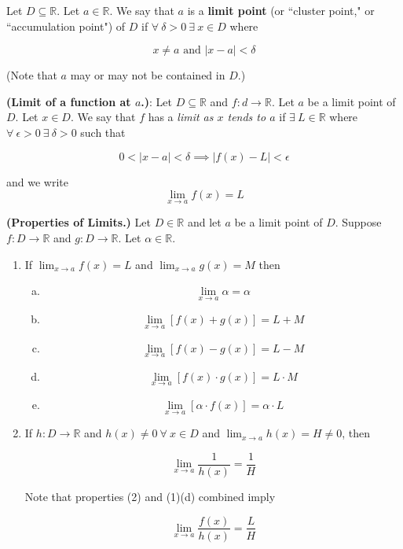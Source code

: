 \begin{definition}\label{ra.def.limit.point} Let \(D \subseteq \mathbb{R}\). Let \(a \in \mathbb{R}\). We say that \(a\) is a \textbf{limit point} (or ``cluster point," or ``accumulation point") of \(D\) if \(\forall \ \delta > 0 \ \exists \ x \in D\) where

\[
x \neq a \text{ and } |x - a| < \delta
\]

(Note that \(a\) may or may not be contained in \(D\).)

\end{definition}

\begin{definition} \textbf{(Limit of a function at \(a\).)}: Let \(D \subseteq \mathbb{R}\) and \(f:d \to \mathbb{R}\). Let \(a\) be a limit point of \(D\). Let \(x \in D\). We say that \(f\) has a \textit{limit as \(x\) tends to \(a\)} if \(\exists \ L \in \mathbb{R}\) where \(\forall \ \epsilon > 0 \ \exists \ \delta > 0 \) such that

\[
0 < |x - a| < \delta \implies |f(x) - L| < \epsilon
\]

and we write \[\lim_{x \to a} f(x) = L\]

\end{definition}

\begin{proposition} \textbf{(Properties of Limits.)} Let \(D \in \mathbb{R}\) and let \(a\) be a limit point of \(D\). Suppose \(f:D \to \mathbb{R}\) and \(g: D \to \mathbb{R}\). Let \(\alpha \in \mathbb{R}\).

\begin{enumerate}[(1)]

\item If \(\lim_{x \to a} f(x) = L\) and \(\lim_{x \to a} g(x) = M\) then

\begin{enumerate}[(a)]

\item \[\lim_{x \to a} \alpha = \alpha\]

\item \[\lim_{x \to a} [f(x) + g(x)] = L + M\]

\item \[\lim_{x \to a} [f(x) - g(x)] = L - M\]

\item \[\lim_{x \to a} [f(x) \cdot g(x)] = L \cdot M\]

\item \[\lim_{x \to a} [\alpha \cdot f(x)] = \alpha \cdot L\]

\end{enumerate}

\item If \(h:D \to \mathbb{R}\) and \(h(x) \neq 0 \ \forall \ x \in D\) and \(\lim_{x \to a} h(x) = H \neq 0\), then

\[
\lim_{x \to a} \frac{1}{h(x)} = \frac{1}{H}
\]

Note that properties (2) and (1)(d) combined imply

\[
\lim_{x \to a} \frac{f(x)}{h(x)} = \frac{L}{H}
\]

\end{enumerate}

\end{proposition}

